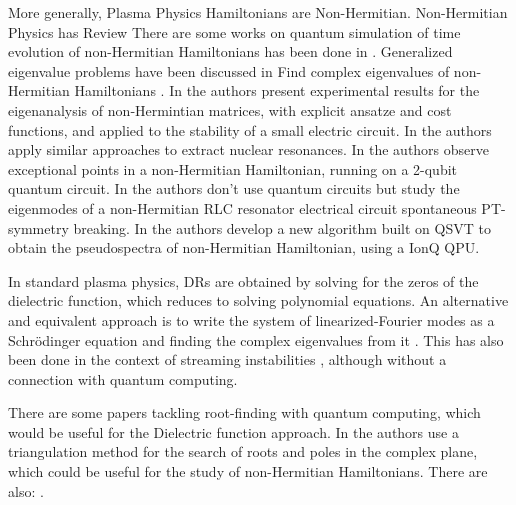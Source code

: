 \documentclass[12pt]{iopart}
\begin{document}
More generally, Plasma Physics Hamiltonians are Non-Hermitian.
Non-Hermitian Physics has Review
\cite{ashidaNonHermitianPhysics2020}
There are some works on quantum simulation of time evolution of non-Hermitian Hamiltonians has been done in \cite{jebraeilliQuantumSimulationQubit2025,zhangObservationExceptionalPoint2021,dograQuantumSimulationParity2021}.
%
Generalized eigenvalue problems have been discussed in \cite{parkerQuantumPhaseEstimation2020,rajchel-mieldziocQuantumAlgorithmSolving2025}
%
Find complex eigenvalues of non-Hermitian Hamiltonians \cite{wangMeasurementbasedQuantumPhase2010,daskinUniversalQuantumCircuit2014,xieVariationalQuantumAlgorithms2024,armaosQuantumComputingAtmospheric2024,liNonHermitianCouplingStrength2025}.
%
In \cite{zhaoUniversalVariationalQuantum2023} the authors present experimental results for the eigenanalysis of non‑Hermintian matrices, with explicit ansatze and cost functions, and applied to the stability of a small electric circuit. In \cite{zhangQuantumComputingExtracting2025, singhQuantumSimulationsNuclear2025} the authors apply similar approaches to extract nuclear resonances.
%
In \cite{zhangObservationExceptionalPoint2021} the authors observe exceptional points in a non-Hermitian Hamiltonian, running on a 2-qubit quantum circuit.
%
In \cite{zhangObservingExponentialGrowth2025} the authors don't use quantum circuits but study the eigenmodes of a non-Hermitian RLC resonator electrical circuit spontaneous PT-symmetry breaking.
%
In \cite{yangEndtoEndQuantumEstimation2026} the authors develop a new algorithm built on QSVT to obtain the pseudospectra of non-Hermitian Hamiltonian, using a IonQ QPU.

In standard plasma physics, DRs are obtained by solving for the zeros of the dielectric function, which reduces to solving polynomial equations.
%
An alternative and equivalent approach is to write the system of linearized-Fourier modes as a Schrödinger equation and finding the complex eigenvalues from it \cite{qinSpontaneousExplicitParitytimesymmetry2021}.
%
This has also been done in the context of streaming instabilities \cite{gamizPlasmaStreamingInstabilities2022}, although without a connection with quantum computing.

There are some papers tackling root-finding with quantum computing, which would be useful for the Dielectric function approach.
%
In \cite{buczkowskiGlobalRootsPoles2024} the authors use a triangulation method for the search of roots and poles in the complex plane, which could be useful for the study of non-Hermitian Hamiltonians.
%
There are also: \cite{tansuwannontQuantumPhaseEstimation2019,nagataEfficientQuantumAlgorithms2018}.
\end{document}

